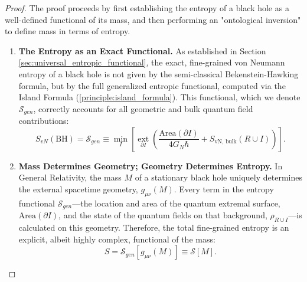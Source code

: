 \documentclass[11pt, letterpaper]{report}
\theoremstyle{plain} %
\theoremstyle{definition} %
\theoremstyle{remark} %
\begin{document}
\begin{proof}
The proof proceeds by first establishing the entropy of a black hole as a well-defined functional of its mass, and then performing an "ontological inversion" to define mass in terms of entropy.

\begin{enumerate}
    \item \textbf{The Entropy as an Exact Functional.} As established in Section \ref{sec:universal_entropic_functional}, the exact, fine-grained von Neumann entropy of a black hole is not given by the semi-classical Bekenstein-Hawking formula, but by the full generalized entropic functional, computed via the Island Formula (\cref{principle:island_formula}). This functional, which we denote $\mathcal{S}_{gen}$, correctly accounts for all geometric and bulk quantum field contributions:
    \begin{equation}
        S_{vN}(\text{BH}) = \mathcal{S}_{gen} \equiv \min_{I} \left[ \operatorname*{ext}_{\partial I} \left( \frac{\text{Area}(\partial I)}{4G_N\hbar} + S_{\text{vN, bulk}}(R \cup I) \right) \right].
    \end{equation}

    \item \textbf{Mass Determines Geometry; Geometry Determines Entropy.} In General Relativity, the mass $M$ of a stationary black hole uniquely determines the external spacetime geometry, $g_{\mu\nu}(M)$. Every term in the entropy functional $\mathcal{S}_{gen}$—the location and area of the quantum extremal surface, $\text{Area}(\partial I)$, and the state of the quantum fields on that background, $\rho_{R \cup I}$—is calculated on this geometry. Therefore, the total fine-grained entropy is an explicit, albeit highly complex, functional of the mass:
    \begin{equation}
        S = \mathcal{S}_{gen}[g_{\mu\nu}(M)] \equiv \mathcal{S}[M].
        \label{eq:entropy_as_mass_functional}
    \end{equation}


\end{enumerate}
\end{proof}
\end{document}
